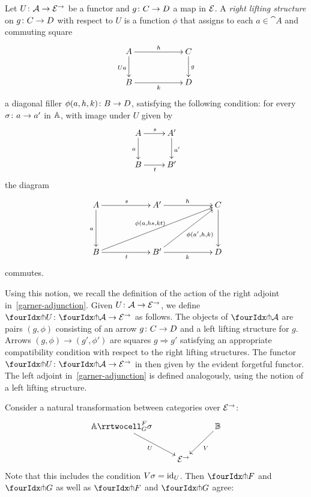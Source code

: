 \documentclass[reqno,10pt,a4paper,oneside]{amsart}
\begin{document}
 
 \begin{definition} Let $U \colon \mathcal{A} \to \mathcal{E}^\to$ be a functor and $g \colon C \to D$ a map in $\mathcal{E}$. 
 A \emph{right lifting structure} on $g \colon C \to D$ with respect to $U$ is 
 a function  $\phi$ that assigns to each $a \in \cat{A}$ and commuting square
\[
\xymatrix@C=2cm{
A \ar[r]^{h}   \ar[d]_{U a} & C \ar[d]^g \\
B \ar[r]_{k} & D}
\]
a diagonal filler $\phi(a, h, k) \colon B \to D$, satisfying the following condition: for every $\sigma \colon a \to a'$ in $\mathbb{A}$, 
with image under $U$ given by
\[
\xymatrix{
A \ar[r]^s \ar[d]_a & A' \ar[d]^{a'}  \\
B \ar[r]_{t} & B'}
\]
the diagram
\[
\xymatrix@C=2cm@R=1.5cm{
A \ar[r]^s \ar[d]_a & A' \ar[r]^{h}  & C \ar[d]   \\
B \ar[r]_{t}  \ar[urr]^{\phi(a, hs, kt)} & B'  \ar[r]_k  \ar[ur]_{\phi(a', h, k)} & D }
\]
commutes. 
 \end{definition}
 
 Using this notion, we recall the definition of the action of the right adjoint in~\eqref{garner-adjunction}. 
 Given $U \colon \mathcal{A} \to \mathcal{E}^\to$, we define $\liftr{U} \co \liftr{\cal{A}} \to \catE^\to$ as follows. The objects of
$ \liftr{\cal{A}}$ are pairs $(g, \phi)$ consisting of an arrow $g \colon C \to D$ and a left lifting structure for $g$.
Arrows $(g, \phi) \to (g', \phi')$ are squares $g \Rightarrow g'$ satisfying an appropriate compatibility condition
with respect to the right lifting structures. The functor $\liftr{U} \co \liftr{\cal{A}} \to \catE^\to$ in then given by
the evident forgetful functor. The left adjoint in~\eqref{garner-adjunction} is defined analogously, using the
notion of a left lifting structure.





\begin{lemma}
Consider a natural transformation between categories over $\mathcal{E}^{\to}$:
\[
\xymatrix{
  \cat{A}
  \rrtwocell_G^F{\sigma}
 \ar[dr]_{U}
&&
  \cat{B}
  \ar[dl]^{V}
\\&
  \catE^{\to}
}
\]
Note that this includes the condition $V \sigma = \operatorname{id}_U$.
Then $\liftr{F}$ and $\liftr{G}$ as well as $\liftl{F}$ and $\liftl{G}$ agree:
\end{lemma}
\end{document}
